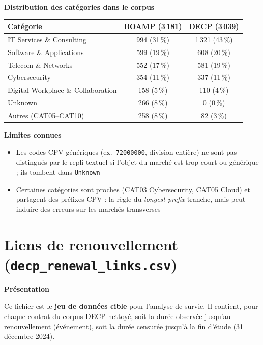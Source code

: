 \documentclass[12pt,a4paper]{article}
\begin{document}
\medskip
\textbf{Distribution des catégories dans le corpus}

\begin{center}
\begin{tabular}{lcc}
\toprule
\textbf{Catégorie} & \textbf{BOAMP (3\,181)} &
  \textbf{DECP (3\,039)} \\
\midrule
IT Services \& Consulting         & 994 (31\,\%) & 1\,321 (43\,\%) \\
Software \& Applications          & 599 (19\,\%) &   608 (20\,\%) \\
Telecom \& Networks               & 552 (17\,\%) &   581 (19\,\%) \\
Cybersecurity                     & 354 (11\,\%) &   337 (11\,\%) \\
Digital Workplace \& Collaboration & 158 (5\,\%) &   110 (4\,\%) \\
Unknown                           & 266 (8\,\%) &     0 (0\,\%) \\
Autres (CAT05--CAT10)             & 258 (8\,\%) &    82 (3\,\%) \\
\bottomrule
\end{tabular}
\end{center}

\medskip
\textbf{Limites connues}

\begin{itemize}
  \item[---] Les codes CPV génériques (ex.\ \texttt{72000000},
    division entière) ne sont pas distingués par le repli textuel si
    l'objet du marché est trop court ou générique ; ils tombent dans
    \texttt{Unknown}
  \item[---] Certaines catégories sont proches (CAT03 Cybersecurity,
    CAT05 Cloud) et partagent des préfixes CPV : la règle du
    \textit{longest prefix} tranche, mais peut induire des erreurs sur les
    marchés transverses
\end{itemize}

\section{Liens de renouvellement (\texttt{decp\_renewal\_links.csv})}
\label{sec:renewal}

\textbf{Présentation}

Ce fichier est le \textbf{jeu de données cible} pour l'analyse de survie.
Il contient, pour chaque contrat du corpus DECP nettoyé, soit la durée
observée jusqu'au renouvellement (événement), soit la durée censurée jusqu'à
la fin d'étude (31 décembre 2024).
\end{document}
